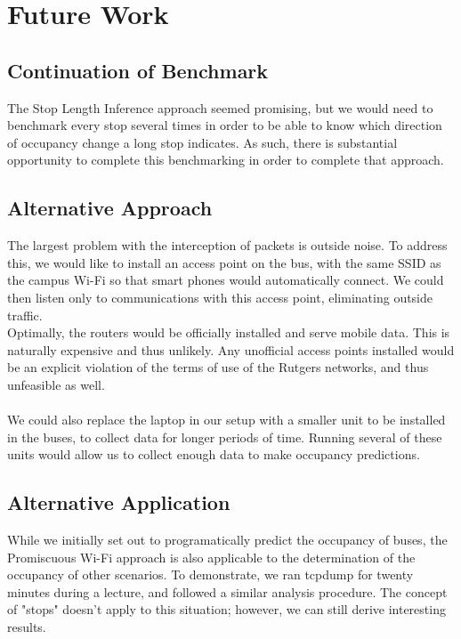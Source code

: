 \documentclass[12pt,journal,compsoc]{IEEEtran}
\begin{document}

\section{Future Work}
    
\subsection*{Continuation of Benchmark}
	The Stop Length Inference approach seemed promising, but we would need to benchmark every stop several times in order to be able to know which direction of occupancy change a long stop indicates.
    As such, there is substantial opportunity to complete this benchmarking in order to complete that approach.

\subsection*{Alternative Approach}
	The largest problem with the interception of packets is outside noise.
	To address this, we would like to install an access point on the bus, with the same SSID as the campus Wi-Fi so that smart phones would automatically connect.
	We could then listen only to communications with this access point, eliminating outside traffic.
	\\
	Optimally, the routers would be officially installed and serve mobile data.
	This is naturally expensive and thus unlikely.
	Any unofficial access points installed would be an explicit violation of the terms of use of the Rutgers networks, and thus unfeasible as well.
	\\\\
	We could also replace the laptop in our setup with a smaller unit to be installed in the buses, to collect data for longer periods of time.
	Running several of these units would allow us to collect enough data to make occupancy predictions.

\subsection*{Alternative Application}
	While we initially set out to programatically predict the occupancy of buses, the Promiscuous Wi-Fi approach is also applicable to the determination of the occupancy of other scenarios.
	To demonstrate, we ran tcpdump for twenty minutes during a lecture, and followed a similar analysis procedure.
	The concept of "stops" doesn't apply to this situation; however, we can still derive interesting results.
\end{document}
